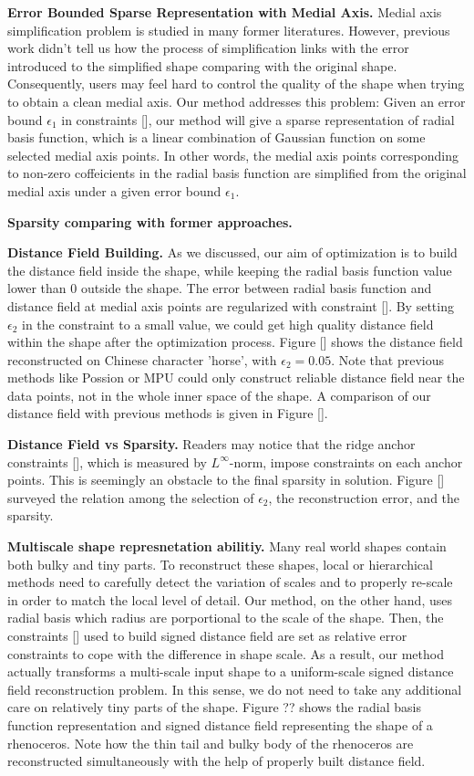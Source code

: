 \documentclass[annual]{acmsiggraph}
\begin{document}
\textbf{Error Bounded Sparse Representation with Medial Axis. }
Medial axis simplification problem is studied in many former literatures. However, previous work didn't tell us how the process of simplification links with the error introduced to the simplified shape comparing with the original shape. Consequently, users may feel hard to control the quality of the shape when trying to obtain a clean medial axis. Our method addresses this problem: Given an error bound $\epsilon_1$ in constraints [], our method will give a sparse representation of radial basis function, which is a linear combination of Gaussian function on some selected medial axis points. In other words, the medial axis points corresponding to non-zero coffeicients in the radial basis function are simplified from the original medial axis under a given error bound $\epsilon_1$. 

\textbf{Sparsity comparing with former approaches. }


\textbf{Distance Field Building. } 
As we discussed, our aim of optimization is to build the distance field inside the shape, while keeping the radial basis function value lower than 0 outside the shape. The error between radial basis function and distance field at medial axis points are regularized with constraint []. By setting $\epsilon_2$ in the constraint to a small value, we could get high quality distance field within the shape after the optimization process. Figure [] shows the distance field reconstructed on Chinese character 'horse', with $\epsilon_2=0.05$. Note that previous methods like Possion or MPU could only construct reliable distance field near the data points, not in the whole inner space of the shape. A comparison of our distance field with previous methods is given in Figure [].

\textbf{Distance Field vs Sparsity. }
Readers may notice that the ridge anchor constraints [], which is measured by $L^{\infty}$-norm, impose constraints on each anchor points. This is seemingly an obstacle to the final sparsity in solution. Figure [] surveyed the relation among the selection of $\epsilon_2$, the reconstruction error, and the sparsity. 

\textbf{Multiscale shape represnetation abilitiy. } 
Many real world shapes contain both bulky and tiny parts. To reconstruct these shapes, local or hierarchical methods need to carefully detect the variation of scales and to properly re-scale in order to match the local level of detail. Our method, on the other hand, uses radial basis which radius are porportional to the scale of the shape. Then, the constraints [] used to build signed distance field are set as relative error constraints to cope with the difference in shape scale. As a result, our method actually transforms a multi-scale input shape to a uniform-scale signed distance field reconstruction problem. In this sense, we do not need to take any additional care on relatively tiny parts of the shape. Figure ?? shows the radial basis function representation and signed distance field representing the shape of a  rhenoceros. Note how the thin tail and bulky body of the rhenoceros are reconstructed simultaneously with the help of properly built distance field. 
\end{document}

